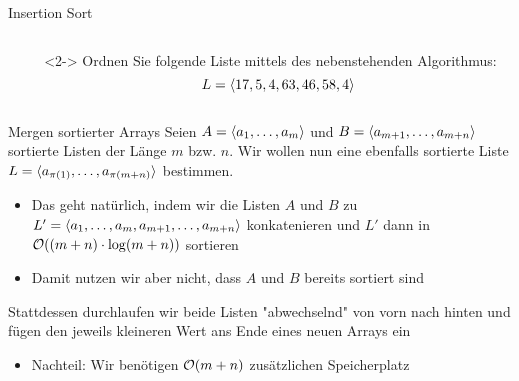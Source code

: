 \begin{frame}{Insertion Sort}
\begin{columns}[T,onlytextwidth]
\begin{column}{0.4\textwidth}
\begin{algorithm}[H]
	\caption{Insertion Sort}
	\label{sort:alg:insertionsort}
	\DontPrintSemicolon
    \;
\end{algorithm}
\end{column}
\begin{column}{0.55\textwidth}
\begin{task}<2->
Ordnen Sie folgende Liste mittels des nebenstehenden Algorithmus: $$L = \langle17, 5, 4, 63, 46, 58, 4\rangle$$
\end{task}

\end{column}
\end{columns}
\end{frame}

\begin{frame}{Mergen sortierter Arrays}
Seien $A = \langle a_1, \dots, a_m\rangle$ und $B = \langle a_{m+1}, \dots, a_{m+n}\rangle$ sortierte Listen der L\"ange $m$ bzw. $n$.
Wir wollen nun eine ebenfalls sortierte Liste $L = \langle a_{\pi(1)}, \dots, a_{\pi(m + n)} \rangle$ bestimmen.
\begin{itemize}
    \item Das geht nat\"urlich, indem wir die Listen $A$ und $B$ zu $L' = \langle a_1, \dots, a_m, a_{m+1}, \dots, a_{m+n}\rangle$ konkatenieren und $L'$ dann in $\mathcal{O}((m + n) \cdot \log(m + n))$ sortieren
    \item Damit nutzen wir aber nicht, dass $A$ und $B$ bereits sortiert sind
\end{itemize}
Stattdessen durchlaufen wir beide Listen "abwechselnd" von vorn nach hinten und f\"ugen den jeweils kleineren Wert ans Ende eines neuen Arrays ein
\begin{itemize}
    \item Nachteil: Wir ben\"otigen $\mathcal{O}(m+n)$ zus\"atzlichen Speicherplatz
\end{itemize}
\end{frame}

